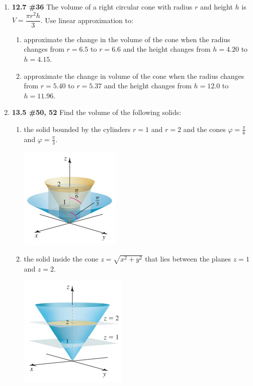 \documentclass[%
]{article}
\begin{document}
\begin{enumerate}
\item {\bf 12.7 \#36}
The volume of a right circular cone with radius $r$ and height $h$ is $V=\dfrac{\pi r^2h}{3}$.  Use linear approximation to:
\begin{enumerate}
	\item approximate the change in the volume of the cone when the radius changes from $r=6.5$ to $r=6.6$ and the height changes from $h=4.20$ to $h=4.15$.
	\item approximate the change in volume of the cone when the radius changes from $r=5.40$ to $r=5.37$ and the height changes from $h=12.0$ to $h=11.96$.
\end{enumerate}

\item {\bf 13.5 \#50, 52}
Find the volume of the following solids:
\begin{enumerate}
	\item the solid bounded by the cylinders $r=1$ and $r=2$ and the cones $\varphi=\frac{\pi}{6}$ and $\varphi=\frac{\pi}{3}$. 
	
	\begin{center}
	\includegraphics[scale=1]{13-5no50}
	\end{center}
	
	\item the solid inside the cone $z=\sqrt{x^2+y^2}$ that lies between the planes $z=1$ and $z=2$.
	
	\begin{center}
	\includegraphics[scale=1]{13-5no52}
	\end{center}
	
\end{enumerate}

\end{enumerate}
\end{document}
